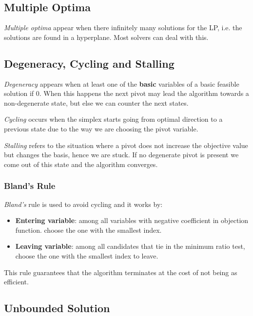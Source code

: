 \subsection{Multiple Optima}

\emph{Multiple optima} appear when there infinitely many solutions for the LP, i.e. the solutions
are found in a hyperplane. Most solvers can deal with this.

\subsection{Degeneracy, Cycling and Stalling}

\emph{Degeneracy} appears when at least one of the \textbf{basic} variables of a basic feasible solution if 0.
When this happens the next pivot may lead the algorithm towards a non-degenerate state, but else we can counter the next states.

\emph{Cycling} occurs when the simplex starts going from optimal direction to a previous state due to the way we are choosing the pivot variable.

\emph{Stalling} refers to the situation where a pivot does not increase the objective value but changes the basis, hence we are stuck.
If no degenerate pivot is present we come out of this state and the algorithm converges.

\subsubsection{Bland's Rule}

\emph{Bland's} rule is used to avoid cycling and it works by:

\begin{itemize}

	\item \textbf{Entering variable}: among all variables with negative coefficient in objection function. choose the one with the smallest index.

	\item \textbf{Leaving variable}: among all candidates that tie in the minimum ratio test, choose the one with the smallest index to leave.

\end{itemize}

This rule guarantees that the algorithm terminates at the cost of not being as efficient.

\subsection{Unbounded Solution}

